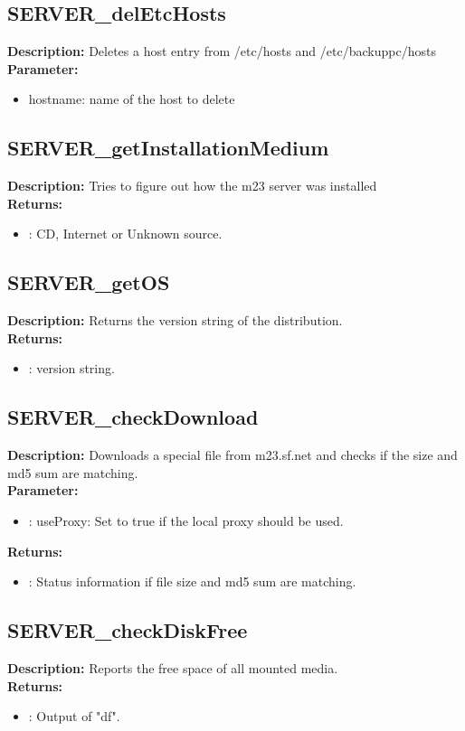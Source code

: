 \subsection{SERVER\_delEtcHosts}
\textbf{Description:} Deletes a host entry from /etc/hosts and /etc/backuppc/hosts\\
\textbf{Parameter:}
\begin{itemize}
\item hostname: name of the host to delete
\end{itemize}

\subsection{SERVER\_getInstallationMedium}
\textbf{Description:} Tries to figure out how the m23 server was installed\\
\textbf{Returns:}
\begin{itemize}
\item : CD, Internet or Unknown source.
\end{itemize}

\subsection{SERVER\_getOS}
\textbf{Description:} Returns the version string of the distribution.\\
\textbf{Returns:}
\begin{itemize}
\item : version string.
\end{itemize}

\subsection{SERVER\_checkDownload}
\textbf{Description:} Downloads a special file from m23.sf.net and checks if the size and md5 sum are matching.\\
\textbf{Parameter:}
\begin{itemize}
\item : useProxy: Set to true if the local proxy should be used.
\end{itemize}
\textbf{Returns:}
\begin{itemize}
\item : Status information if file size and md5 sum are matching.
\end{itemize}

\subsection{SERVER\_checkDiskFree}
\textbf{Description:} Reports the free space of all mounted media.\\
\textbf{Returns:}
\begin{itemize}
\item : Output of "df".
\end{itemize}

